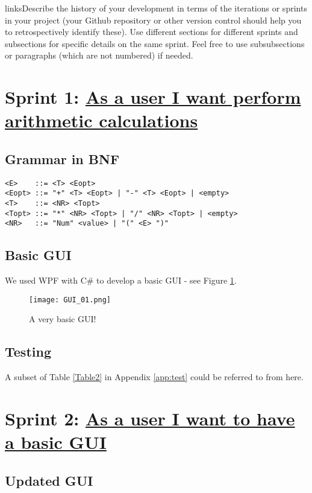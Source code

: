 \documentclass[a4paper, oneside, 11pt]{report}
\begin{document}
linksDescribe the history of your development in terms of the iterations or sprints in your project (your Github repository or other version control should help you to retrospectively identify these). Use different sections for different sprints and subsections for specific details on the same sprint. Feel free to use subsubsections or paragraphs (which are not numbered) if needed. 

\section{Sprint 1: \href{https://liamfarese.atlassian.net/browse/AP-8}{As a user I want perform arithmetic calculations}}
\subsection{Grammar in BNF}
\begin{verbatim}
<E>    ::= <T> <Eopt>
<Eopt> ::= "+" <T> <Eopt> | "-" <T> <Eopt> | <empty>
<T>    ::= <NR> <Topt>
<Topt> ::= "*" <NR> <Topt> | "/" <NR> <Topt> | <empty>
<NR>   ::= "Num" <value> | "(" <E> ")"
\end{verbatim}

\subsection{Basic GUI}
We used WPF with C\# to develop a basic GUI - see Figure \ref{gui01}.

\begin{figure}[htb]
\begin{center}
\texttt{[image: GUI\_01.png]}
\caption{A very basic GUI!}
\label{gui01}
\end{center}
\end{figure}

\subsection{Testing}
A subset of Table \ref{Table2} in Appendix \ref{app:test} could be referred to from here.

\section{Sprint 2: \href{https://liamfarese.atlassian.net/browse/AP-30}{As a user I want to have a basic GUI}}

\subsection{Updated GUI}
\end{document}
